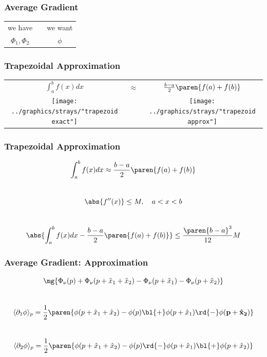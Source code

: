 \documentclass[]{beamer}
\begin{document}
\begin{frame}
  \frametitle{Average Gradient}  %
\begin{table}[htdp]  %
    \begin{center}
        \begin{tabular}{ccc}
            we have & \qquad \qquad & we want \\[15pt]
            $\Phi_{1}, \Phi_{2}$ & & $\phi$
        \end{tabular}
    \end{center}
\end{table}%
\end{frame}
\begin{frame}
  \frametitle{Trapezoidal Approximation}  %
\begin{table}[htdp]  %
    \begin{center}
        \begin{tabular}{ccc}
            $\int_{a}^{b} f(x) dx$ & $\approx$ & $\frac{b - a} {2} \paren{ f(a) + f(b) }$ \\[20pt]
            \texttt{[image: ../graphics/strays/"trapezoid exact"]} &&
            \texttt{[image: ../graphics/strays/"trapezoid approx"]}
        \end{tabular}
    \end{center}
\end{table}%
\end{frame}

\begin{frame}
  \frametitle{Trapezoidal Approximation}  %
  $$\int_{a}^{b} f(x) dx \approx \frac{b - a} {2} \paren{ f(a) + f(b) }$$ \\[10pt]
  \pause
  $$\abs{f''(x)} \le M, \quad a < x < b$$ \\[10pt]
  $$\abs{\int_{a}^{b} f(x) dx - \frac{b - a} {2} \paren{ f(a) + f(b) }} \le \frac{\paren{b-a}^3}{12} M$$
\end{frame}

\begin{frame}
  \frametitle{Average Gradient: Approximation}  %
  $$\mg{\Phi_{\nu}(p) + \Phi_{\nu}(p + \hat{x}_{1} + \hat{x}_{2}) - \Phi_{\nu}(p + \hat{x}_{1}) - \Phi_{\nu}(p + \hat{x}_{2})}$$\\[10pt]
  $$\langle \partial_{1}\phi \rangle_{p} = \frac{1}{2} 
  \paren{\phi(p+\hat{x}_{1}+\hat{x}_{2}) - \phi(p) \bl{\bf{+}} \phi(p+\hat{x}_{1}) \bf{\rd{ - }} \phi(p+\hat{x}_{2})}$$\\[10pt]
  $$\langle \partial_{2}\phi \rangle_{p} = \frac{1}{2} 
  \paren{\phi(p+\hat{x}_{1}+\hat{x}_{2}) - \phi(p) \rd{-} \phi(p+\hat{x}_{1}) \bl{+} \phi(p+\hat{x}_{2})}$$
\end{frame}
\end{document}

